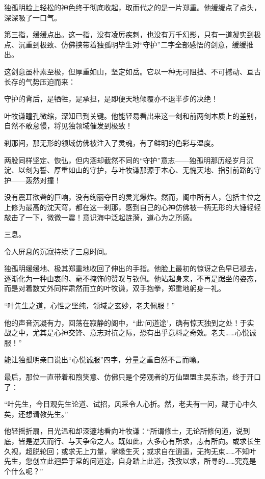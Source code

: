 独孤明脸上轻松的神色终于彻底收起，取而代之的是一片郑重。他缓缓点了点头，深深吸了一口气。

第三指，缓缓点出。这一指，没有凌厉疾刺，也没有万千幻影，只有一道凝实到极点、沉重到极致、仿佛挟带着独孤明毕生对“守护”二字全部感悟的剑意，缓缓推出。

这剑意虽朴素至极，但厚重如山，坚定如岳。它以一种无可阻挡、不可撼动、亘古长存的气势压迫而来：

守护的背后，是牺牲，是承担，是即便天地倾覆亦不退半步的决绝！

叶牧谦瞳孔微缩，深知已到关键。他能轻易看出来这一剑和前两剑本质上的差别，自然不敢怠慢，将见独领域催发到极致！

刹那间，那无形的领域仿佛被注入了灵魂，有了鲜明的色彩与温度。

两股同样坚定、恢弘，但内涵却截然不同的“守护”意志——独孤明那历经岁月沉淀、以剑为誓、厚重如山的守护，与叶牧谦那源于本心、无愧天地、指引前路的守护——轰然对撞！

没有震耳欲聋的巨响，没有绚丽夺目的灵光爆炸。然而，阁中所有人，包括主位之上修为最高的沈天穹，都在这一刹那，感到自己的心神仿佛被一柄无形的大锤轻轻敲击了一下，微微一震！意识海中泛起涟漪，道心为之所感。

三息。

令人屏息的沉寂持续了三息时间。

独孤明缓缓地、极其郑重地收回了伸出的手指。他脸上最初的惊讶之色早已褪去，逐渐化为一种由衷的、毫不掩饰的赞叹与钦佩。他站起身来，不再是踞坐的姿态，而是对着数丈外同样肃然而立的叶牧谦，双手抱拳，郑重地躬身一礼。

“叶先生之道，心性之坚纯，领域之玄妙，老夫佩服！”

他的声音沉凝有力，回荡在寂静的阁中，“此‘问道途’，确有惊天独到之处！于实战之中，尤其是心神交锋、意志对抗之际，恐有出乎意料之奇效。老夫……心悦诚服！”

能让独孤明亲口说出“心悦诚服”四字，分量之重自然不言而喻。

\vspace{2em}

最后，那位一直带着和煦笑意、仿佛只是个旁观者的万仙盟盟主吴东浩，终于开口了：

“叶先生，今日观先生论道、试招，风采令人心折。然，老夫有一问，藏于心中久矣，还想请教先生。”

他轻摇折扇，目光温和却深邃地看向叶牧谦：“所谓修士，无论所修何道，说到底，皆是逆天而行、与天争命之人。既如此，大多心有所求，志有所向。或求长生久视，超脱轮回；或求无上力量，掌缘生灭；或求自在逍遥，无拘无束……不知叶先生，您创立此迥异于常的问道途，自身踏上此道，孜孜以求，所寻的……究竟是个什么呢？”

